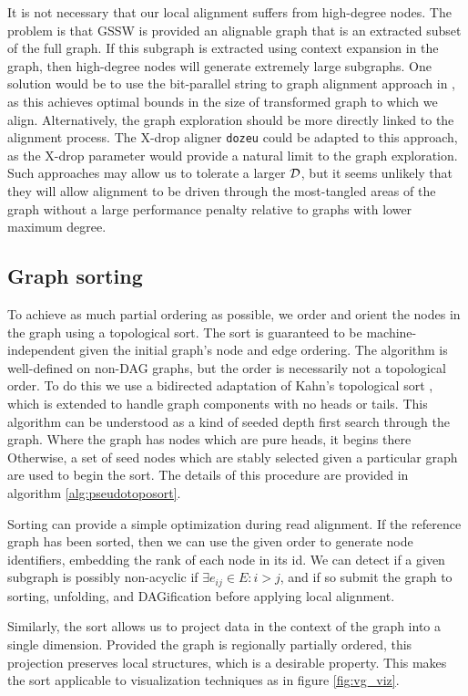 It is not necessary that our local alignment suffers from high-degree nodes.
The problem is that GSSW is provided an alignable graph that is an extracted subset of the full graph.
If this subgraph is extracted using context expansion in the graph, then high-degree nodes will generate extremely large subgraphs.
One solution would be to use the bit-parallel string to graph alignment approach in \cite{rautiainen2018bit}, as this achieves optimal bounds in the size of transformed graph to which we align.
Alternatively, the graph exploration should be more directly linked to the alignment process.
The X-drop aligner {\tt dozeu} could be adapted to this approach, as the X-drop parameter would provide a natural limit to the graph exploration.
Such approaches may allow us to tolerate a larger ${\cal D}$, but it seems unlikely that they will allow alignment to be driven through the most-tangled areas of the graph without a large performance penalty relative to graphs with lower maximum degree.

\subsection{Graph sorting}

To achieve as much partial ordering as possible, we order and orient the nodes in the graph using a topological sort.
The sort is guaranteed to be machine-independent given the initial graph's node and edge ordering.
The algorithm is well-defined on non-DAG graphs, but the order is necessarily not a topological order.
To do this we use a bidirected adaptation of Kahn's topological sort \cite{kahn1962topological}, which is extended to handle graph components with no heads or tails.
This algorithm can be understood as a kind of seeded depth first search through the graph.
Where the graph has nodes which are pure heads, it begins there
Otherwise, a set of seed nodes which are stably selected given a particular graph are used to begin the sort.
The details of this procedure are provided in algorithm \ref{alg:pseudotoposort}.

Sorting can provide a simple optimization during read alignment.
If the reference graph has been sorted, then we can use the given order to generate node identifiers, embedding the rank of each node in its id.
We can detect if a given subgraph is possibly non-acyclic if $\exists e_{ij} \in E : i > j$, and if so submit the graph to sorting, unfolding, and DAGification before applying local alignment.

Similarly, the sort allows us to project data in the context of the graph into a single dimension.
Provided the graph is regionally partially ordered, this projection preserves local structures, which is a desirable property.
This makes the sort applicable to visualization techniques as in figure \ref{fig:vg_viz}.

